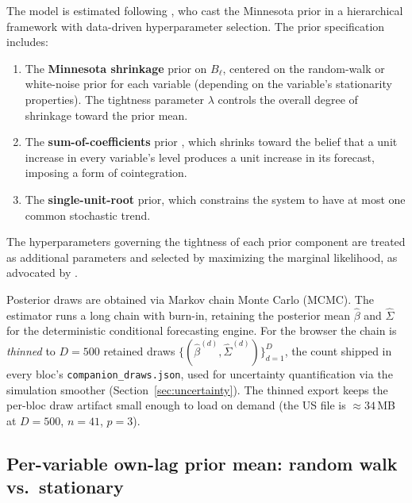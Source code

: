 \documentclass[11pt]{article}
\theoremstyle{definition}
\theoremstyle{remark}
\begin{document}
The model is estimated following \citet{Giannone2015}, who cast the
Minnesota prior \citep{Litterman1986, DoanLittermanSims1984} in a
hierarchical framework with data-driven hyperparameter selection.
The prior specification includes:
\begin{enumerate}[label=(\alph*)]
  \item The \textbf{Minnesota shrinkage} prior on $B_\ell$, centered
    on the random-walk or white-noise prior for each variable
    (depending on the variable's stationarity properties).  The
    tightness parameter $\lambda$ controls the overall degree of
    shrinkage toward the prior mean.
  \item The \textbf{sum-of-coefficients} prior
    \citep{DoanLittermanSims1984}, which shrinks toward the belief
    that a unit increase in every variable's level produces a unit
    increase in its forecast, imposing a form of cointegration.
  \item The \textbf{single-unit-root} prior, which constrains the
    system to have at most one common stochastic trend.
\end{enumerate}

The hyperparameters governing the tightness of each prior component
are treated as additional parameters and selected by maximizing the
marginal likelihood, as advocated by \citet{Giannone2015}.

Posterior draws are obtained via Markov chain Monte Carlo (MCMC).
The estimator runs a long chain with burn-in, retaining the posterior
mean $\hat\beta$ and $\hat\Sigma$ for the deterministic conditional
forecasting engine. For the browser the chain is \emph{thinned} to
$D=500$ retained draws
$\bigl\{(\hat\beta^{(d)}, \hat\Sigma^{(d)})\bigr\}_{d=1}^{D}$, the count
shipped in every bloc's \texttt{companion\_draws.json}, used for
uncertainty quantification via the simulation smoother
(Section~\ref{sec:uncertainty}). The thinned export keeps the per-bloc
draw artifact small enough to load on demand (the US file is
$\approx 34$\,MB at $D=500$, $n=41$, $p=3$).

\subsection{Per-variable own-lag prior mean: random walk vs.\ stationary}\label{sec:ownlag}
\end{document}
